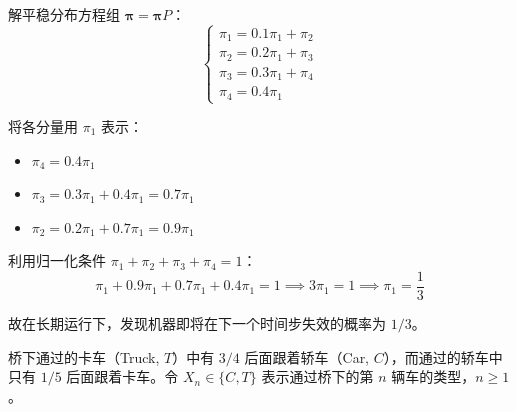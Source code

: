 \begin{questions}
\begin{solution}
解平稳分布方程组 $\boldsymbol{\pi} = \boldsymbol{\pi} P$：
\[
\begin{cases}
\pi_1 = 0.1\pi_1 + \pi_2 \\
\pi_2 = 0.2\pi_1 + \pi_3 \\
\pi_3 = 0.3\pi_1 + \pi_4 \\
\pi_4 = 0.4\pi_1
\end{cases}
\]

将各分量用 $\pi_1$ 表示：
\begin{itemize}
    \item $\pi_4 = 0.4\pi_1$
    \item $\pi_3 = 0.3\pi_1 + 0.4\pi_1 = 0.7\pi_1$
    \item $\pi_2 = 0.2\pi_1 + 0.7\pi_1 = 0.9\pi_1$
\end{itemize}

利用归一化条件 $\pi_1 + \pi_2 + \pi_3 + \pi_4 = 1$：
\[ \pi_1 + 0.9\pi_1 + 0.7\pi_1 + 0.4\pi_1 = 1 \implies 3\pi_1 = 1 \implies \pi_1 = \frac{1}{3} \]

故在长期运行下，发现机器即将在下一个时间步失效的概率为 $1/3$。
\end{solution}

\question 桥下通过的卡车（Truck, $T$）中有 $3/4$ 后面跟着轿车（Car, $C$），而通过的轿车中只有 $1/5$ 后面跟着卡车。令 $X_n \in \{C, T\}$ 表示通过桥下的第 $n$ 辆车的类型，$n \geqslant 1$。

\end{questions}
